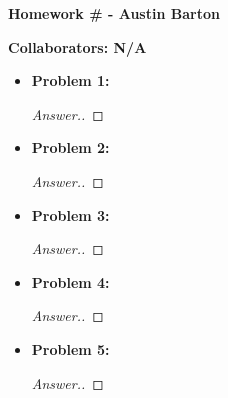 \documentclass[10pt,twoside]{article}
\begin{document}
\begin{center}
\huge{\bf{Homework \#} - Austin Barton}
\end{center}

\medskip

\noindent \large{\textbf{Collaborators: N/A}}

\medskip

\begin{itemize}
    \item\textbf{Problem 1:} \newline
    \noindent\makebox[\linewidth]{\rule{18cm}{0.4pt}}
    \begin{proof}[Answer.] 
    \end{proof}
    
    \item\textbf{Problem 2:} \newline
    \noindent\makebox[\linewidth]{\rule{18cm}{0.4pt}}
    \begin{proof}[Answer.]
    
    \end{proof}
    
    \item\textbf{Problem 3:} \newline
    \noindent\makebox[\linewidth]{\rule{18cm}{0.4pt}}
    \begin{proof}[Answer.]
    
    \end{proof}
    
    \item\textbf{Problem 4:} \newline
    \noindent\makebox[\linewidth]{\rule{18cm}{0.4pt}}
    \begin{proof}[Answer.]
    
    \end{proof}
    
    \item\textbf{Problem 5:} \newline
    \noindent\makebox[\linewidth]{\rule{18cm}{0.4pt}}
    \begin{proof}[Answer.]
    
    \end{proof}
\end{itemize}

\label{LastPage}
\end{document}
